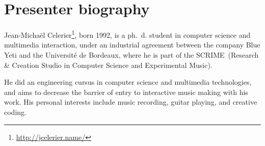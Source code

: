 \documentclass[11pt]{article}
\begin{document}
\section*{Presenter biography}
Jean-Michaël Celerier\footnote{\url{http://jcelerier.name/}}, born 1992, is a ph.~d. student in computer science and multimedia interaction, under an industrial agreement between the company Blue Yeti and the Université de Bordeaux, where he is part of the SCRIME~(Research \& Creation Studio in Computer Science and Experimental Music).

He did an engineering cursus in computer science and multimedia technologies, and aims to decrease the barrier of entry to interactive music making with his work. His personal interests include music recording, guitar playing, and creative coding.

\nocite{baltazar_i-score_2014}
\nocite{de2016presentation}
\nocite{celerier2015ossia}
\nocite{celerier2016outils}

\printbibliography
\end{document}

